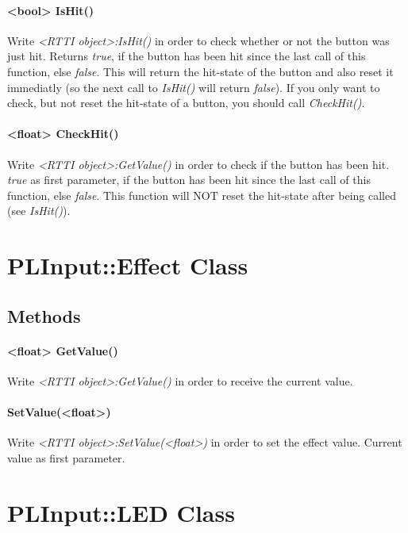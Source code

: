 \paragraph{<bool> IsHit()}
Write \emph{<RTTI object>:IsHit()} in order to check whether or not the button was just hit. Returns \emph{true}, if the button has been hit since the last call of this function, else \emph{false}. This will return the hit-state of the button and also reset it immediatly (so the next call to \emph{IsHit()} will return \emph{false}). If you only want to check, but not reset the hit-state of a button, you should call \emph{CheckHit()}.

\paragraph{<float> CheckHit()}
Write \emph{<RTTI object>:GetValue()} in order to check if the button has been hit. \emph{true} as first parameter, if the button has been hit since the last call of this function, else \emph{false}. This function will NOT reset the hit-state after being called (see \emph{IsHit()}).




\section{PLInput::Effect Class}


\subsection{Methods}

\paragraph{<float> GetValue()}
Write \emph{<RTTI object>:GetValue()} in order to receive the current value.

\paragraph{SetValue(<float>)}
Write \emph{<RTTI object>:SetValue(<float>)} in order to set the effect value. Current value as first parameter.




\section{PLInput::LED Class}


